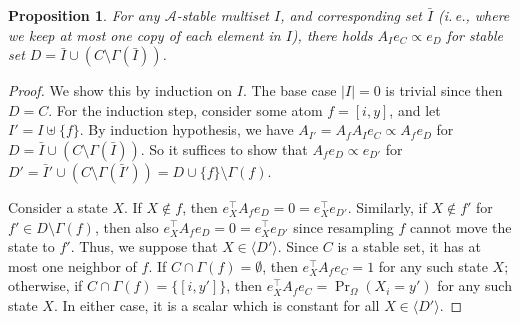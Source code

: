 \documentclass[11pt]{article}
\newtheorem{proposition}[theorem]{Proposition}
\newcommand{\ie}{i.\,e.}
\begin{document}
\begin{proposition}
\label{add-1-prop_00}
For any $\mathcal A$-stable multiset $I$, and corresponding set $\bar I$ (\ie, where we keep at most one copy of each element in $I$), there holds $A_I e_C \propto e_{D}$ for stable set $D = \bar I \cup (C \setminus \Gamma(\bar I))$.
\end{proposition}
\begin{proof}
We show this by induction on $I$. The base case $|I| = 0$ is trivial since then $D = C$. For the induction step, consider some atom $f = [i,y]$, and let $I' = I \uplus \{ f \}$. By induction hypothesis, we have $A_{I'} = A_f A_I e_C \propto A_f e_D$ for $D = \bar I \cup (C \setminus \Gamma(\bar I))$. So it suffices to show that $A_f e_D \propto e_{D'}$ for $D' = \bar I' \cup (C \setminus \Gamma(\bar I')) = D \cup \{f \} \setminus \Gamma(f)$.

Consider a state $X$. If $X \notin f$, then $e_{X}^{\top} A_f e_D = 0 = e_{X}^{\top} e_{D'}$. Similarly, if $X\notin f'$ for $f' \in D \setminus \Gamma(f)$, then also $e_{X}^{\top} A_f e_D = 0 = e_{X}^{\top} e_{D'}$ since resampling $f$ cannot move the state to $f'$.  Thus, we suppose that $X \in \langle D' \rangle$.  Since $C$ is a stable set, it has at most one neighbor of $f$. If $C \cap \Gamma(f)  = \emptyset$, then $e_X^{\top} A_f e_C = 1$ for any such state $X$; otherwise, if $C \cap \Gamma(f) = \{ [i, y'] \}$, then $e_X^{\top} A_f e_C = \Pr_{\Omega}(X_i = y')$ for any such state $X$. In either case, it is a scalar which is constant for all $X \in \langle D' \rangle$.
\end{proof}
\end{document}
